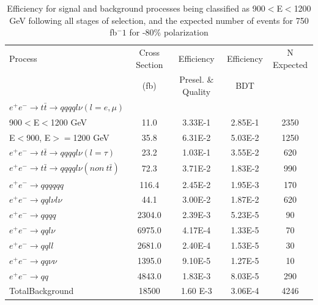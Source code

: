 \begin{table}
  \centering
  \begin{tabular}{l | c | c | c | c}
    \toprule
     Process     & Cross Section & Efficiency & Efficiency & N Expected\\
     & (fb) & Presel. \& Quality & BDT & \\
     \midrule
    $e^+e^-\rightarrow t\bar{t} \rightarrow qqqql\nu (l=e,\mu)$&  &  & &\\
    900$<$E$<$1200 GeV & 11.0 & 3.33E-1 & 2.85E-1 & 2350\\
    E$<$900, E$>=$1200 GeV & 35.8 & 6.31E-2 & 5.03E-2 & 1250 \\
    \midrule
    $e^+e^-\rightarrow t\bar{t} \rightarrow qqqql\nu (l=\tau)$& 23.2 & 1.03E-1  & 3.55E-2 & 620 \\
    \midrule
    $e^+e^-\rightarrow t\bar{t} \rightarrow qqqql\nu (non ~ t\bar{t})$& 72.3 & 3.71E-2 & 1.83E-2 & 990\\
    \midrule
    $e^+e^-\rightarrow qqqqqq$ & 116.4 & 2.45E-2 & 1.95E-3& 170 \\
    \midrule
    $e^+e^-\rightarrow qql\nu l\nu$ & 44.1 & 3.00E-2 & 1.87E-2 & 620\\
    \midrule
    $e^+e^-\rightarrow qqqq$ & 2304.0 & 2.39E-3 & 5.23E-5 & 90 \\
    \midrule
    $e^+e^-\rightarrow qql\nu$ & 6975.0 & 4.17E-4& 1.33E-5& 70 \\
    \midrule
    $e^+e^-\rightarrow qqll$ & 2681.0 & 2.40E-4& 1.53E-5 & 30 \\
    \midrule
    $e^+e^-\rightarrow qq\nu\nu$ & 1395.0 & 9.10E-5 & 1.27E-5 & 10 \\
    \midrule
    $e^+e^-\rightarrow qq$ & 4843.0 & 1.83E-3 & 8.03E-5 & 290\\
    \midrule
    \midrule
    TotalBackground & 18500 & 1.60 E-3 & 3.06E-4&  4246 \\
    \bottomrule
  \end{tabular}
  \caption{Efficiency for signal and background processes being classified as 900$<$E$<$1200 GeV following all stages of selection, and the expected number of events for 750 fb$^-1$ for -80\% polarization}
  \label{table:topfinalefficienciesnegMidE}
\end{table}

